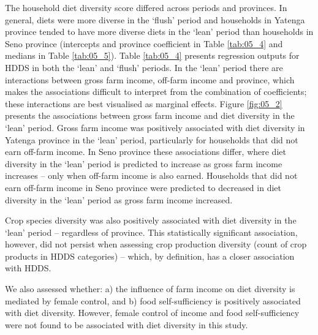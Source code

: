The household diet diversity score differed across periods and provinces. In general, diets were more diverse in the `flush' period and households in Yatenga province tended to have more diverse diets in the `lean' period than households in Seno province (intercepts and province coefficient in Table \ref{tab:05_4} and medians in Table \ref{tab:05_5}). Table \ref{tab:05_4} presents regression outputs for HDDS in both the `lean' and `flush' periods. In the `lean' period there are interactions between gross farm income, off-farm income and province, which makes the associations difficult to interpret from the combination of coefficients; these interactions are best visualised as marginal effects. Figure \ref{fig:05_2} presents the associations between gross farm income and diet diversity in the `lean' period. Gross farm income was positively associated with diet diversity in Yatenga province in the `lean' period, particularly for households that did not earn off-farm income. In Seno province these associations differ, where diet diversity in the `lean' period is predicted to increase as gross farm income increases -- only when off-farm income is also earned. Households that did not earn off-farm income in Seno province were predicted to decreased in diet diversity in the `lean' period as gross farm income increased.

Crop species diversity was also positively associated with diet diversity in the `lean' period -- regardless of province. This statistically significant association, however, did not persist when assessing crop production diversity (count of crop products in HDDS categories) -- which, by definition, has a closer association with HDDS.

We also assessed whether: a) the influence of farm income on diet diversity is mediated by female control, and b) food self-sufficiency is positively associated with diet diversity. However, female control of income and food self-sufficiency were not found to be associated with diet diversity in this study.



